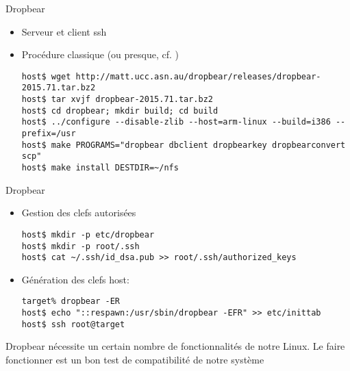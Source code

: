 \begin{frame}[fragile=singleslide]{Dropbear}
  \begin{itemize}
  \item Serveur et client ssh
  \item Procédure classique (ou presque, cf. )
    \begin{lstlisting}
host$ wget http://matt.ucc.asn.au/dropbear/releases/dropbear-2015.71.tar.bz2
host$ tar xvjf dropbear-2015.71.tar.bz2
host$ cd dropbear; mkdir build; cd build
host$ ../configure --disable-zlib --host=arm-linux --build=i386 --prefix=/usr
host$ make PROGRAMS="dropbear dbclient dropbearkey dropbearconvert scp"
host$ make install DESTDIR=~/nfs
    \end{lstlisting}
  \end{itemize}
\end{frame}

\begin{frame}[fragile=singleslide]{Dropbear}
  \begin{itemize}
  \item Gestion des clefs autorisées
    \begin{lstlisting}
host$ mkdir -p etc/dropbear
host$ mkdir -p root/.ssh
host$ cat ~/.ssh/id_dsa.pub >> root/.ssh/authorized_keys
    \end{lstlisting}%
  \item Génération des clefs host:
    \begin{lstlisting}
target% dropbear -ER
host$ echo "::respawn:/usr/sbin/dropbear -EFR" >> etc/inittab
host$ ssh root@target
    \end{lstlisting}
  \end{itemize}
  Dropbear  nécessite un  certain  nombre de  fonctionnalités de  notre
  Linux.  Le faire  fonctionner est  un bon  test de  compatibilité de
  notre système
\end{frame}

